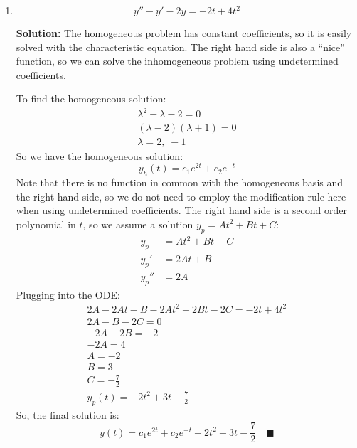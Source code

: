 \documentclass[letterpaper, fontsize=10pt]{scrartcl} %
\numberwithin{equation}{section} %
\numberwithin{figure}{section} %
\numberwithin{table}{section} %
\begin{document}
\begin{enumerate}
\begin{enumerate}[label=(\alph*)]
\item 
\[ y'' -y' -2y=-2t+4t^2\]
\par \textbf{Solution:} The homogeneous problem has constant coefficients, so it is easily solved with the characteristic equation. The right hand side is also a ``nice'' function, so we can solve the inhomogeneous problem using undetermined coefficients. 
\par To find the homogeneous solution:
\begin{gather*}
\lambda^2 - \lambda - 2 = 0\\
(\lambda-2)(\lambda+1) = 0\\
\lambda = 2,\; -1
\end{gather*}
So we have the homogeneous solution:
\[ y_h(t) = c_1 e^{2t} + c_2 e^{-t} \]
Note that there is no function in common with the homogeneous basis and the right hand side, so we do not need to employ the modification rule here when using undetermined coefficients. The right hand side is a second order polynomial in $t$, so we assume a solution $y_p = At^2 + Bt + C$:
\begin{align*}
y_p &= At^2 + Bt + C\\
y_p' &= 2At + B\\
y_p'' &= 2A
\end{align*}
Plugging into the ODE:
\begin{gather*}
2A -2At - B -2At^2 - 2Bt - 2C=-2t+4t^2\\
2A - B - 2C = 0\\
-2A - 2B = -2\\
-2A = 4\\
A = -2\\
B = 3\\
C = -\frac{7}{2}\\
y_p(t) = -2t^2 + 3t - \frac{7}{2}
\end{gather*}
So, the final solution is:
\[ y(t) =  c_1 e^{2t} + c_2 e^{-t} -2t^2 + 3t - \frac{7}{2} \quad\blacksquare \]


\end{enumerate}
\end{enumerate}
\end{document}
